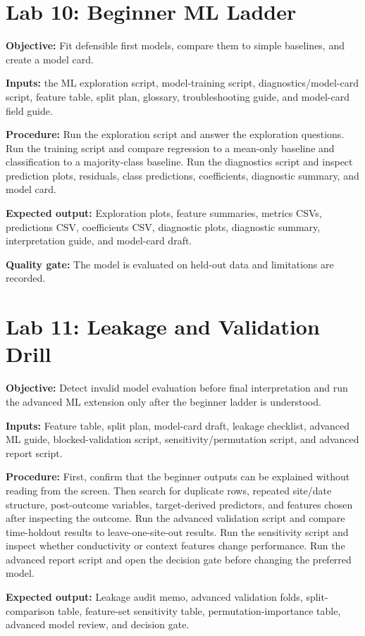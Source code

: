 \section{Lab 10: Beginner ML Ladder}
\textbf{Objective:} Fit defensible first models, compare them to simple baselines, and create a model card.

\textbf{Inputs:} the ML exploration script, model-training script, diagnostics/model-card script, feature table, split plan, glossary, troubleshooting guide, and model-card field guide.

\textbf{Procedure:} Run the exploration script and answer the exploration questions. Run the training script and compare regression to a mean-only baseline and classification to a majority-class baseline. Run the diagnostics script and inspect prediction plots, residuals, class predictions, coefficients, diagnostic summary, and model card.

\textbf{Expected output:} Exploration plots, feature summaries, metrics CSVs, predictions CSV, coefficients CSV, diagnostic plots, diagnostic summary, interpretation guide, and model-card draft.

\textbf{Quality gate:} The model is evaluated on held-out data and limitations are recorded.

\section{Lab 11: Leakage and Validation Drill}
\textbf{Objective:} Detect invalid model evaluation before final interpretation and run the advanced ML extension only after the beginner ladder is understood.

\textbf{Inputs:} Feature table, split plan, model-card draft, leakage checklist, advanced ML guide, blocked-validation script, sensitivity/permutation script, and advanced report script.

\textbf{Procedure:} First, confirm that the beginner outputs can be explained without reading from the screen. Then search for duplicate rows, repeated site/date structure, post-outcome variables, target-derived predictors, and features chosen after inspecting the outcome. Run the advanced validation script and compare time-holdout results to leave-one-site-out results. Run the sensitivity script and inspect whether conductivity or context features change performance. Run the advanced report script and open the decision gate before changing the preferred model.

\textbf{Expected output:} Leakage audit memo, advanced validation folds, split-comparison table, feature-set sensitivity table, permutation-importance table, advanced model review, and decision gate.

